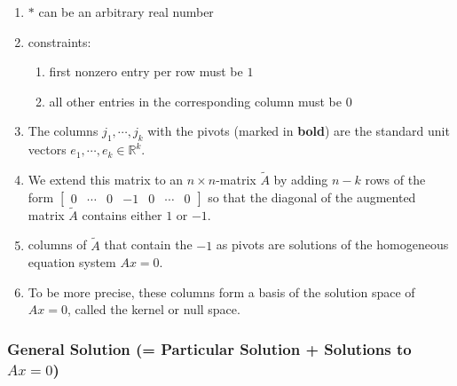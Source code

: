 \begin{enumerate}
    \item $*$ can be an arbitrary real number
    \hfill \cite{mfml/book/mml/Deisenroth-Faisal-Ong}

    \item constraints:
    \begin{enumerate}
        \item first nonzero entry per row must be $1$
        \hfill \cite{mfml/book/mml/Deisenroth-Faisal-Ong}

        \item all other entries in the corresponding column must be $0$
        \hfill \cite{mfml/book/mml/Deisenroth-Faisal-Ong}
    \end{enumerate}

    \item The columns $j_1, \cdots , j_k$ with the pivots (marked in \textbf{bold}) are the standard unit vectors $e_1, \cdots , e_k \in \mathbb{R}^k$.
    \hfill \cite{mfml/book/mml/Deisenroth-Faisal-Ong}

    \item We extend this matrix to an $n \times n$-matrix $\tilde{A}$ by adding $n - k$ rows of the form 
    $
        \begin{bmatrix}
            0 & \cdots & 0 & -1 & 0 & \cdots & 0
        \end{bmatrix}
    $
    so that the diagonal of the augmented matrix $\tilde{A}$ contains either $1$ or $-1$.
    \hfill \cite{mfml/book/mml/Deisenroth-Faisal-Ong}

    \item columns of $\tilde{A}$ that contain the $-1$ as pivots are solutions of the homogeneous equation system $Ax = 0$.
    \hfill \cite{mfml/book/mml/Deisenroth-Faisal-Ong}

    \item To be more precise, these columns form a basis of the solution space of $Ax = 0$, called the kernel or null space.
    \hfill \cite{mfml/book/mml/Deisenroth-Faisal-Ong}
\end{enumerate}










\subsubsection{General Solution (= Particular Solution + Solutions to $Ax=0$)}

